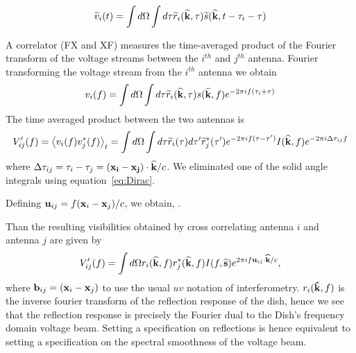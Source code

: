 \documentclass[twocolumn]{emulateapj}
\begin{document}
\begin{equation}
\widetilde{v}_i(t) = \int d \Omega \int d \tau \widetilde{r}_i({\bf \widehat{k}},\tau) \widetilde{s}({\bf \widehat{k}},t- \tau_i - \tau)
\end{equation}

A correlator (FX and XF) measures the time-averaged product of the Fourier transform of the voltage streams between the $i^{th}$ and $j^{th}$ antenna. Fourier transforming the voltage stream from the $i^{th}$ antenna we obtain
\begin{equation}
v_i(f) = \int d \Omega \int d \tau \widetilde{r}_i({\bf \widehat{k}},\tau) s({\bf \widehat{k}},f)e^{-2 \pi i f(\tau_i+\tau)}
\end{equation}
The time averaged product between the two antennas is
\begin{equation}
V_{ij}'(f) = \left \langle v_i(f) v_j^*(f) \right \rangle_t = \int d \Omega \int d \tau \widetilde{r}_i(\tau) d \tau' \widetilde{r}^*_j(\tau')e^{-2 \pi i f (\tau-\tau') } I({\bf \widehat{k}}, f) e^{- 2 \pi i \Delta \tau_{ij}f} 
\end{equation}
where $\Delta \tau_{ij} = \tau_i-\tau_j = ({\bf x_i - x_j}) \cdot {\bf \widehat{k}}/c$. We eliminated one of the solid angle integrals using equation~\ref{eq:Dirac}. 

Defining ${\bf u}_{ij} = f ({\bf x}_i-{\bf x}_j)/c$, we obtain,
.

 
 

Than the resulting visibilities obtained by cross correlating antenna $i$ and antenna $j$ are given by 
\begin{equation}\label{eq:Visibility}
V'_{ij}(f) =  \int d \Omega r_i({\bf \widehat{k}},f) r^*_j({\bf \widehat{k}},f)  I(f,{\bf \widehat{s}})e^{2 \pi i f {\bf u}_{ij} \cdot {\bf \widehat{k}}/c},
\end{equation}
where ${\bf b}_{ij} = ({\bf x}_i - {\bf x}_j )$ to use the usual $uv$ notation of interferometry. $r_i({\bf \hat{k}},f)$ is the inverse fourier transform of the reflection response of the dish, hence we see that the reflection response is precisely the Fourier dual to the Dish's frequency domain voltage beam. Setting a specification on reflections is hence equivalent to setting a specification on the spectral smoothness of the voltage beam. 
\end{document}
